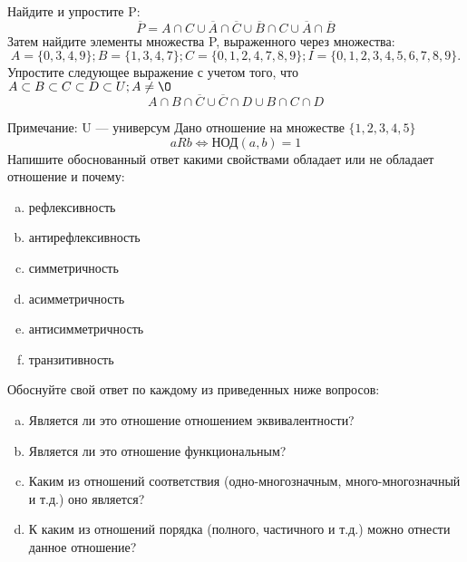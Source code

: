 \documentclass[10pt]{exam}
\begin{document}
\begin{questions}
\question
Найдите и упростите P:
\begin{equation*}
\overline{P} = A \cap C \cup \overline{A} \cap \overline{C} \cup \overline{B} \cap C \cup \overline{A} \cap \overline{B}
\end{equation*}
Затем найдите элементы множества P, выраженного через множества:
\begin{equation*}
A = \{0, 3, 4, 9\}; 
B = \{1, 3, 4, 7\};
C = \{0, 1, 2, 4, 7, 8, 9\};
I = \{0, 1, 2, 3, 4, 5, 6, 7, 8, 9\}.
\end{equation*}\question
Упростите следующее выражение с учетом того, что $A\subset B \subset C \subset D \subset U; A \neq \O$
\begin{equation*}
A \cap B  \cap \overline{C} \cup \overline{C} \cap D \cup B \cap C \cap D
\end{equation*}

Примечание: U — универсум\question
Дано отношение на множестве $\{1, 2, 3, 4, 5\}$ 
\begin{equation*}
aRb \iff  \text{НОД}(a,b) =1
\end{equation*}
Напишите обоснованный ответ какими свойствами обладает или не обладает отношение и почему:   
\begin{enumerate} [a)]\setcounter{enumi}{0}
\item рефлексивность
\item антирефлексивность
\item симметричность
\item асимметричность
\item антисимметричность
\item транзитивность
\end{enumerate}

Обоснуйте свой ответ по каждому из приведенных ниже вопросов:
\begin{enumerate} [a)]\setcounter{enumi}{0}
    \item Является ли это отношение отношением эквивалентности?
    \item Является ли это отношение функциональным?
    \item Каким из отношений соответствия (одно-многозначным, много-многозначный и т.д.) оно является?
    \item К каким из отношений порядка (полного, частичного и т.д.) можно отнести данное отношение?
\end{enumerate}



\end{questions}
\end{document}
